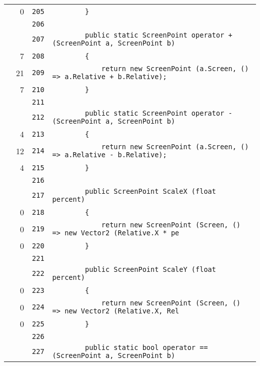 \documentclass[a4paper,10pt]{article}
\begin{document}
\begin{longtable}[l]{lrrl}
\cellcolor{red} & 0 & \verb~205~ & \verb~        }~\\
\cellcolor{gray} &  & \verb~206~ & \verb~~\\
\cellcolor{gray} &  & \verb~207~ & \verb~        public static ScreenPoint operator + (ScreenPoint a, ScreenPoint b)~\\
\cellcolor{green} & 7 & \verb~208~ & \verb~        {~\\
\cellcolor{green} & 21 & \verb~209~ & \verb~            return new ScreenPoint (a.Screen, () => a.Relative + b.Relative);~\\
\cellcolor{green} & 7 & \verb~210~ & \verb~        }~\\
\cellcolor{gray} &  & \verb~211~ & \verb~~\\
\cellcolor{gray} &  & \verb~212~ & \verb~        public static ScreenPoint operator - (ScreenPoint a, ScreenPoint b)~\\
\cellcolor{green} & 4 & \verb~213~ & \verb~        {~\\
\cellcolor{green} & 12 & \verb~214~ & \verb~            return new ScreenPoint (a.Screen, () => a.Relative - b.Relative);~\\
\cellcolor{green} & 4 & \verb~215~ & \verb~        }~\\
\cellcolor{gray} &  & \verb~216~ & \verb~~\\
\cellcolor{gray} &  & \verb~217~ & \verb~        public ScreenPoint ScaleX (float percent)~\\
\cellcolor{red} & 0 & \verb~218~ & \verb~        {~\\
\cellcolor{red} & 0 & \verb~219~ & \verb~            return new ScreenPoint (Screen, () => new Vector2 (Relative.X * pe~\\
\cellcolor{red} & 0 & \verb~220~ & \verb~        }~\\
\cellcolor{gray} &  & \verb~221~ & \verb~~\\
\cellcolor{gray} &  & \verb~222~ & \verb~        public ScreenPoint ScaleY (float percent)~\\
\cellcolor{red} & 0 & \verb~223~ & \verb~        {~\\
\cellcolor{red} & 0 & \verb~224~ & \verb~            return new ScreenPoint (Screen, () => new Vector2 (Relative.X, Rel~\\
\cellcolor{red} & 0 & \verb~225~ & \verb~        }~\\
\cellcolor{gray} &  & \verb~226~ & \verb~~\\
\cellcolor{gray} &  & \verb~227~ & \verb~        public static bool operator == (ScreenPoint a, ScreenPoint b)~\\

\end{longtable}
\end{document}
